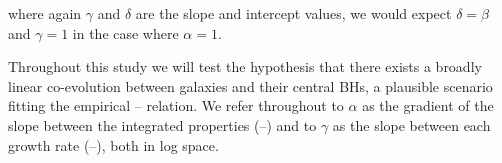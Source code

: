 \noindent where again $\gamma$ and $\delta$ are the slope and intercept values,
we would expect $\delta = \beta$ and $\gamma = 1$ in the case where $\alpha =
1$.

Throughout this study we will test the hypothesis that there exists a broadly
linear co-evolution between galaxies and their central BHs, a plausible
scenario fitting the empirical -- relation. We refer
throughout to $\alpha$ as the gradient of the slope between the integrated
properties (--) and to $\gamma$ as the slope between each
growth rate (\BHAR--\SFR), both in log space.
